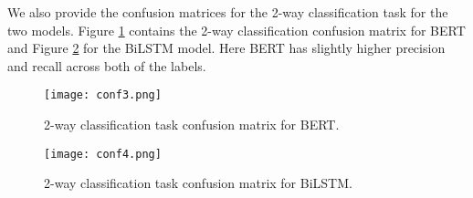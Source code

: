 \documentclass[11pt]{article}
\begin{document}
We also provide the confusion matrices for the 2-way classification task for the two models. Figure \ref{figure:BERTconf_2way} contains the 2-way classification confusion matrix for BERT and Figure \ref{figure:BiLSTMconf_2way} for the BiLSTM model. Here BERT has slightly higher precision and recall across both of the labels.



\begin{figure}[h!]
    \centering
    \texttt{[image: conf3.png]}
    \caption{2-way classification task confusion matrix for BERT.}
    \label{figure:BERTconf_2way}
\end{figure}

\begin{figure}[h!]
    \centering
    \texttt{[image: conf4.png]}
    \caption{2-way classification task confusion matrix for BiLSTM.}
    \label{figure:BiLSTMconf_2way}
\end{figure}
\end{document}
